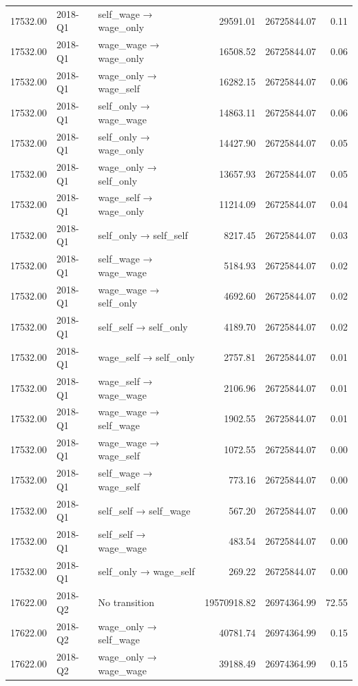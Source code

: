 \begin{table}[ht]
{\begin{tabular}{rllrrr}
  17532.00 & 2018-Q1 & self\_wage → wage\_only & 29591.01 & 26725844.07 & 0.11 \\ 
  17532.00 & 2018-Q1 & wage\_wage → wage\_only & 16508.52 & 26725844.07 & 0.06 \\ 
  17532.00 & 2018-Q1 & wage\_only → wage\_self & 16282.15 & 26725844.07 & 0.06 \\ 
  17532.00 & 2018-Q1 & self\_only → wage\_wage & 14863.11 & 26725844.07 & 0.06 \\ 
  17532.00 & 2018-Q1 & self\_only → wage\_only & 14427.90 & 26725844.07 & 0.05 \\ 
  17532.00 & 2018-Q1 & wage\_only → self\_only & 13657.93 & 26725844.07 & 0.05 \\ 
  17532.00 & 2018-Q1 & wage\_self → wage\_only & 11214.09 & 26725844.07 & 0.04 \\ 
  17532.00 & 2018-Q1 & self\_only → self\_self & 8217.45 & 26725844.07 & 0.03 \\ 
  17532.00 & 2018-Q1 & self\_wage → wage\_wage & 5184.93 & 26725844.07 & 0.02 \\ 
  17532.00 & 2018-Q1 & wage\_wage → self\_only & 4692.60 & 26725844.07 & 0.02 \\ 
  17532.00 & 2018-Q1 & self\_self → self\_only & 4189.70 & 26725844.07 & 0.02 \\ 
  17532.00 & 2018-Q1 & wage\_self → self\_only & 2757.81 & 26725844.07 & 0.01 \\ 
  17532.00 & 2018-Q1 & wage\_self → wage\_wage & 2106.96 & 26725844.07 & 0.01 \\ 
  17532.00 & 2018-Q1 & wage\_wage → self\_wage & 1902.55 & 26725844.07 & 0.01 \\ 
  17532.00 & 2018-Q1 & wage\_wage → wage\_self & 1072.55 & 26725844.07 & 0.00 \\ 
  17532.00 & 2018-Q1 & self\_wage → wage\_self & 773.16 & 26725844.07 & 0.00 \\ 
  17532.00 & 2018-Q1 & self\_self → self\_wage & 567.20 & 26725844.07 & 0.00 \\ 
  17532.00 & 2018-Q1 & self\_self → wage\_wage & 483.54 & 26725844.07 & 0.00 \\ 
  17532.00 & 2018-Q1 & self\_only → wage\_self & 269.22 & 26725844.07 & 0.00 \\ 
  17622.00 & 2018-Q2 & No transition & 19570918.82 & 26974364.99 & 72.55 \\ 
  17622.00 & 2018-Q2 & wage\_only → self\_wage & 40781.74 & 26974364.99 & 0.15 \\ 
  17622.00 & 2018-Q2 & wage\_only → wage\_wage & 39188.49 & 26974364.99 & 0.15 \\ 

\end{tabular}}
\end{table}
